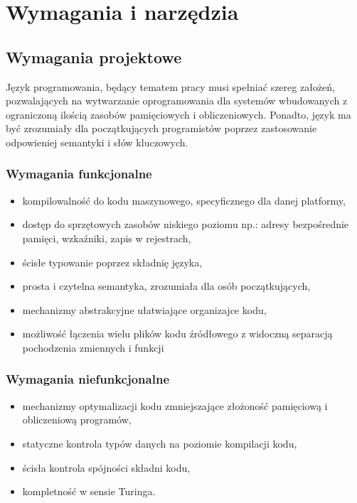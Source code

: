 \chapter{Wymagania i narzędzia}
\label{ch:wymagania-i-narzedzia}

\section{Wymagania projektowe}

Język programowania, będący tematem pracy musi spełniać szereg założeń, pozwalających na wytwarzanie oprogramowania dla systemów wbudowanych z ograniczoną ilością zasobów pamięciowych i obliczeniowych. Ponadto, język ma być zrozumiały dla początkujących programistów poprzez zastosowanie odpowieniej semantyki i słów kluczowych.

\subsection{Wymagania funkcjonalne}
\begin{itemize}
\item kompilowalność do kodu maszynowego, specyficznego dla danej platformy,
\item dostęp do sprzętowych zasobów niskiego poziomu np.: adresy bezpośrednie pamięci, wzkaźniki, zapis w rejestrach,
\item ścisłe typowanie poprzez składnię języka,
\item prosta i czytelna semantyka, zrozumiała dla osób początkujących,
\item mechanizmy abstrakcyjne ułatwiające organizajce kodu,
\item możliwość łączenia wielu plików kodu źródłowego z widoczną separacją pochodzenia zmiennych i funkcji
\end{itemize}

\subsection{Wymagania niefunkcjonalne}
\begin{itemize}
\item mechanizmy optymalizacji kodu zmniejszające złożoność pamięciową i obliczeniową programów,
\item statyczne kontrola typów danych na poziomie kompilacji kodu,
\item ścisła kontrola spójności składni kodu,
\item kompletność w sensie Turinga.
\end{itemize}

